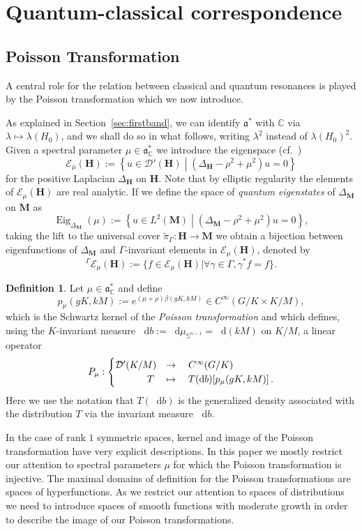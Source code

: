 \documentclass[10pt]{amsart}
\theoremstyle{definition}
\newtheorem{defi}[cdrthm]{Definition}
\DeclareMathOperator{\Eig}{Eig}
\newcommand{\cc}{\mathbb{C}}
\newcommand{\bfh}{\mathbf{H}}
\newcommand{\bfm}{\mathbf{M}}
\newcommand{\la}{\lambda}
\newcommand{\til}{\widetilde}
\newcommand{\intd}{\mathop{}\!\mathrm{d}}
\renewcommand{\a}{\mathfrak a}
\let\oldforall\forall
\renewcommand*{\forall}{\mathrel{\oldforall}}
\begin{document}
\section{Quantum-classical correspondence}
\subsection{Poisson Transformation}
A central role for the relation between classical and quantum resonances is played by the Poisson transformation which we now introduce.

As explained in Section~\ref{sec:firstband}, we can identify $\mathfrak{a}^*$ with $\cc$ via $\la\mapsto \la(H_0)$, and we shall do so in what follows, writing $\la^2$ instead of $\la(H_0)^2$. Given a spectral parameter $\mu\in \mathfrak a_\cc^*$ we introduce the eigenspace (cf.~\cite{vBS87})
\[
\mathcal E_\mu({\bfh}) :=\left\{u\in \mathcal D'({\bfh})\middle| \left(\Delta_{{\bfh}}-\rho^2+\mu^2\right) u=0\right\}
\]
for the positive Laplacian $\Delta_{{\bfh}}$ on ${\bfh}$. Note that by elliptic regularity the elements of $\mathcal E_\mu({\bfh})$ are real analytic. If we define the space of \emph{quantum eigenstates} of $\Delta_{\bfm}$ on ${\bfm}$ as
\[
\Eig_{\Delta_{\bfm}}(\mu) :=\left\{u\in L^2({\bfm})\middle| \left(\Delta_{\bfm} -\rho^2+\mu^2\right) u=0\right\},
\]
taking the lift to the universal cover $\til\pi_{\Gamma}: {\bfh} \to {\bfm}$ we obtain a bijection between eigenfunctions of $\Delta_{\bfm}$ and $\Gamma$-invariant elements in $\mathcal E_\mu({\bfh})$, denoted by
\[
^\Gamma \mathcal E_\mu({\bfh}):=\{f\in \mathcal E_\mu({\bfh})\mid \forall \gamma\in \Gamma, \gamma^*f=f\}.
\]

\begin{defi}
Let $\mu\in\a^*_\cc$ and define
\[
p_\mu(gK, kM) := e^{(\mu+\rho) \beta(gK,kM)} \in C^\infty(G/K\times K/M),
\]
which is the Schwartz kernel of the \emph{Poisson transformation} and which defines, using the $K$-invariant measure $\intd b:=\intd \mu_{\mathbb S^ {n-1}} = \intd(kM)$ on $K/M$, a linear operator
\[
P_\mu: 
\begin{cases}
\mathcal D'(K/M) &\rightarrow\quad C^\infty(G/K)\\
\mkern 59mu T &\mapsto\quad T(\intd b)[p_\mu(gK,kM)]\,.
\end{cases}
\]
Here we use the notation that $T(\intd b)$ is the generalized density associated with the distribution $T$ via the invariant measure $\intd b$.
\end{defi}

In the case of rank $1$ symmetric spaces, kernel and image of the Poisson transformation have very explicit descriptions. In this paper we mostly restrict our attention to spectral parameters $\mu$ for which the Poisson transformation is injective. The maximal domains of definition for the Poisson transformations are spaces of hyperfunctions. As we restrict our attention to spaces of distributions we need to introduce spaces of smooth functions with moderate growth in order to describe the image of our Poisson transformations.
\end{document}
